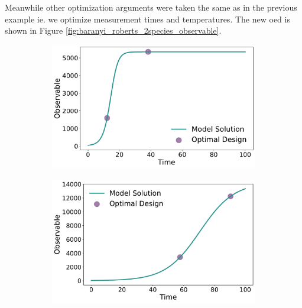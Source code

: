 \documentclass[10pt,A4paper]{article}
\begin{document}
Meanwhile other optimization arguments were taken the same as in the previous example ie. we optimize measurement times and temperatures.
The new \ac{oed} is shown in Figure \ref{fig:baranyi_roberts_2species_observable}.
\begin{figure}[H]
    \begin{subfigure}{.5\textwidth}
        \centering
        \includegraphics[scale=0.255]{Figures/Observable_Results_baranyi_roberts_ode_fisher_determinant_2species_rel_sensit_cont_2times_2temps_000_x_00.pdf}
      \end{subfigure} 
    \begin{subfigure}{.5\textwidth}
        \centering
        \includegraphics[scale=0.255]{Figures/Observable_Results_baranyi_roberts_ode_fisher_determinant_2species_rel_sensit_cont_2times_2temps_001_x_00.pdf}
    \end{subfigure}

\end{figure}
\end{document}
